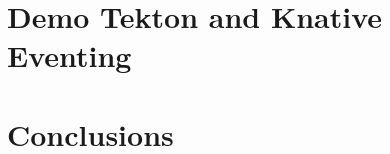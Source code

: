 \documentclass[aspectratio=169,11pt,hyperref={colorlinks=true}]{beamer}
\begin{document}
\begin{lblackrwhiteframe}
\begin{lblackrwhiteframe}
\begin{blackframe}

\section {Demo Tekton and Knative Eventing}

\section{Conclusions}


\end{blackframe}
\end{lblackrwhiteframe}
\end{lblackrwhiteframe}
\end{document}
